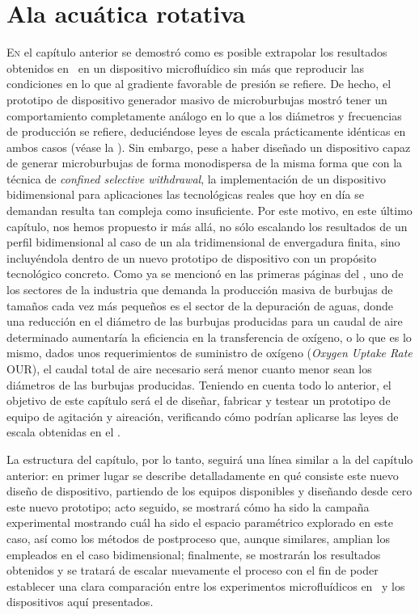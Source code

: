 \chapter{Ala acuática rotativa}
\pagestyle{esitscCD}
\epigraph{ }{}

\lettrine[lraise=-0.1, lines=2, loversize=0.25]{E}{n} el capítulo anterior se demostró como es posible extrapolar los resultados obtenidos en~\cite{Evangelio2015} en un dispositivo microfluídico sin más que reproducir las condiciones en lo que al gradiente favorable de presión se refiere. De hecho, el prototipo de dispositivo generador masivo de microburbujas mostró tener un comportamiento completamente análogo en lo que a los diámetros y frecuencias de producción se refiere, deduciéndose leyes de escala prácticamente idénticas en ambos casos (véase la ). Sin embargo, pese a haber diseñado un dispositivo capaz de generar microburbujas de forma monodispersa de la misma forma que con la técnica de \textit{confined selective withdrawal}, la implementación de un dispositivo bidimensional para aplicaciones las tecnológicas reales que hoy en día se demandan resulta tan compleja como insuficiente. Por este motivo, en este último capítulo, nos hemos propuesto ir más allá, no sólo escalando los resultados de un perfil bidimensional al caso de un ala tridimensional de envergadura finita, sino incluyéndola dentro de un nuevo prototipo de dispositivo con un propósito tecnológico concreto. Como ya se mencionó en las primeras páginas del , uno de los sectores de la industria que demanda la producción masiva de burbujas de tamaños cada vez más pequeños es el sector de la depuración de aguas, donde una reducción en el diámetro de las burbujas producidas para un caudal de aire determinado aumentaría la eficiencia en la transferencia de oxígeno, o lo que es lo mismo, dados unos requerimientos de suministro de oxígeno (\emph{Oxygen Uptake Rate} OUR), el caudal total  de aire necesario será menor cuanto menor sean los diámetros de las burbujas producidas. Teniendo en cuenta todo lo anterior, el objetivo de este capítulo será el de diseñar, fabricar y testear un prototipo de equipo de agitación y aireación, verificando cómo podrían aplicarse las leyes de escala obtenidas en el .

La estructura del capítulo, por lo tanto, seguirá una línea similar a la del capítulo anterior: en primer lugar se describe detalladamente en qué consiste este nuevo diseño de dispositivo, partiendo de los equipos disponibles y diseñando desde cero este nuevo prototipo; acto seguido, se mostrará cómo ha sido la campaña experimental mostrando cuál ha sido el espacio paramétrico explorado en este caso, así como los métodos de postproceso que, aunque similares, amplian los empleados en el caso bidimensional; finalmente, se mostrarán los resultados obtenidos y se tratará de escalar nuevamente el proceso con el fin de poder establecer una clara comparación entre los experimentos microfluídicos en~\cite{Evangelio2015} y los dispositivos aquí presentados.


